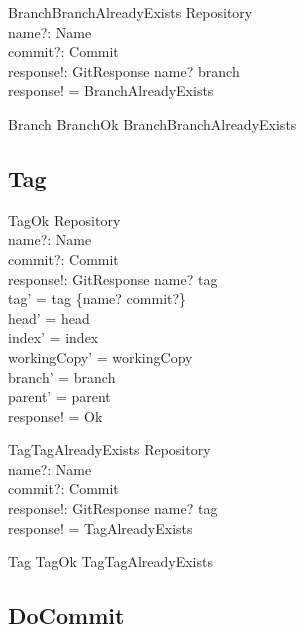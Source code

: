 \begin{schema}{BranchBranchAlreadyExists}
	\Xi Repository \\
	name?: Name \\
	commit?: Commit \\
	response!: GitResponse
\where
	name? \in \dom branch \\
  response! = BranchAlreadyExists
\end{schema}

\begin{zed}
	Branch  BranchOk \lor BranchBranchAlreadyExists
\end{zed}

\subsection{Tag}

\begin{schema}{TagOk}
	\Delta Repository \\
	name?: Name \\
	commit?: Commit \\
	response!: GitResponse
\where
	name? \notin \dom tag \\
	tag' = tag \cup \{name? \mapsto commit?\} \\
	head' = head \\
	index' = index \\
	workingCopy' = workingCopy \\
	branch' = branch \\
	parent' = parent \\
	response! = Ok
\end{schema}

\begin{schema}{TagTagAlreadyExists}
	\Xi Repository \\
	name?: Name \\
	commit?: Commit \\
	response!: GitResponse
\where
	name? \in \dom tag \\
  response! = TagAlreadyExists
\end{schema}

\begin{zed}
	Tag  TagOk \lor TagTagAlreadyExists
\end{zed}

\subsection{DoCommit}


